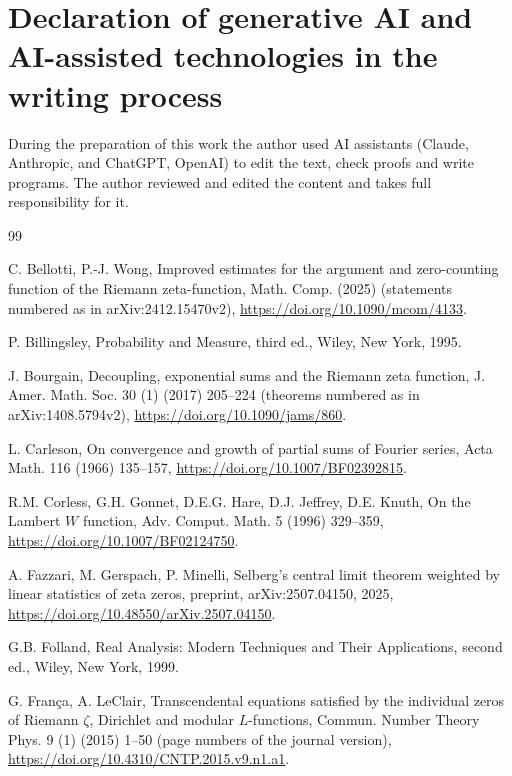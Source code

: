\documentclass[preprint,12pt]{elsarticle}
\numberwithin{equation}{section}
\theoremstyle{plain}
\theoremstyle{definition}
\theoremstyle{remark}
\begin{document}
\section*{Declaration of generative AI and AI-assisted technologies in the writing process}
During the preparation of this work the author used AI assistants (Claude, Anthropic, and ChatGPT, OpenAI) to edit the text, check proofs and write programs. The author reviewed and edited the content and takes full responsibility for it.


\begin{thebibliography}{99}

C. Bellotti, P.-J. Wong, Improved estimates for the argument and zero-counting function of the Riemann zeta-function, Math. Comp. (2025) (statements numbered as in arXiv:2412.15470v2), \href{https://doi.org/10.1090/mcom/4133}{https://doi.org/10.1090/mcom/4133}.

P. Billingsley, Probability and Measure, third ed., Wiley, New York, 1995.

J. Bourgain, Decoupling, exponential sums and the Riemann zeta function, J. Amer. Math. Soc. 30 (1) (2017) 205--224 (theorems numbered as in arXiv:1408.5794v2), \href{https://doi.org/10.1090/jams/860}{https://doi.org/10.1090/jams/860}.

L. Carleson, On convergence and growth of partial sums of Fourier series, Acta Math. 116 (1966) 135--157, \href{https://doi.org/10.1007/BF02392815}{https://doi.org/10.1007/BF02392815}.

R.M. Corless, G.H. Gonnet, D.E.G. Hare, D.J. Jeffrey, D.E. Knuth, On the Lambert $W$ function, Adv. Comput. Math. 5 (1996) 329--359, \href{https://doi.org/10.1007/BF02124750}{https://doi.org/10.1007/BF02124750}.

A. Fazzari, M. Gerspach, P. Minelli, Selberg's central limit theorem weighted by linear statistics of zeta zeros, preprint, arXiv:2507.04150, 2025, \href{https://doi.org/10.48550/arXiv.2507.04150}{https://doi.org/10.48550/arXiv.2507.04150}.

G.B. Folland, Real Analysis: Modern Techniques and Their Applications, second ed., Wiley, New York, 1999.




G. Fran\c{c}a, A. LeClair, Transcendental equations satisfied by the individual zeros of Riemann $\zeta$, Dirichlet and modular $L$-functions, Commun. Number Theory Phys. 9 (1) (2015) 1--50 (page numbers of the journal version), \href{https://doi.org/10.4310/CNTP.2015.v9.n1.a1}{https://doi.org/10.4310/CNTP.2015.v9.n1.a1}.


\end{thebibliography}
\end{document}
